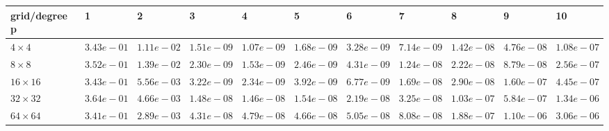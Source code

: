 \begin{tabular}{lllllllllll}
\hline
 grid/degree p   & 1          & 2          & 3          & 4          & 5          & 6          & 7          & 8          & 9          & 10         \\
\hline
 $4 \times 4$    & $3.43e-01$ & $1.11e-02$ & $1.51e-09$ & $1.07e-09$ & $1.68e-09$ & $3.28e-09$ & $7.14e-09$ & $1.42e-08$ & $4.76e-08$ & $1.08e-07$ \\
 $8 \times 8$    & $3.52e-01$ & $1.39e-02$ & $2.30e-09$ & $1.53e-09$ & $2.46e-09$ & $4.31e-09$ & $1.24e-08$ & $2.22e-08$ & $8.79e-08$ & $2.56e-07$ \\
 $16 \times 16$  & $3.43e-01$ & $5.56e-03$ & $3.22e-09$ & $2.34e-09$ & $3.92e-09$ & $6.77e-09$ & $1.69e-08$ & $2.90e-08$ & $1.60e-07$ & $4.45e-07$ \\
 $32 \times 32$  & $3.64e-01$ & $4.66e-03$ & $1.48e-08$ & $1.46e-08$ & $1.54e-08$ & $2.19e-08$ & $3.25e-08$ & $1.03e-07$ & $5.84e-07$ & $1.34e-06$ \\
 $64 \times 64$  & $3.41e-01$ & $2.89e-03$ & $4.31e-08$ & $4.79e-08$ & $4.66e-08$ & $5.05e-08$ & $8.08e-08$ & $1.88e-07$ & $1.10e-06$ & $3.06e-06$ \\
\hline
\end{tabular}